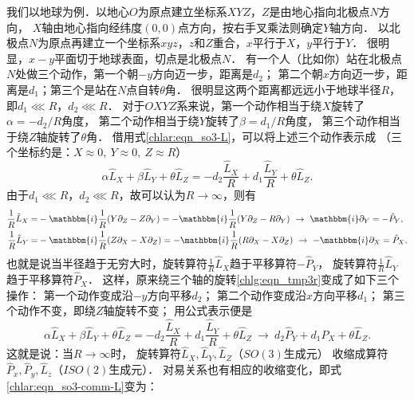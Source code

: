 我们以地球为例．以地心$O$为原点建立坐标系$XYZ$，$Z$是由地心指向北极点$N$方向，
$X$轴由地心指向经纬度$(0,0)$点方向，按右手叉乘法则确定$Y$轴方向．
以北极点$N$为原点再建立一个坐标系$xyz$，$z$和$Z$重合，$x$平行于$X$，$y$平行于$Y$．
很明显，$x-y$平面切于地球表面，切点是北极点$N$．
有一个人（比如你）站在北极点$N$处做三个动作，第一个朝$-y$方向迈一步，距离是$d_2$；
第二个朝$x$方向迈一步，距离是$d_1$；第三个是站在$N$点自转$\theta$角．
很明显这两个距离都远远小于地球半径$R$，即$d_1 \lll R$，$d_2\lll R$．
对于$OXYZ$系来说，第一个动作相当于绕$X$旋转了$\alpha=-d_2/R$角度，
第二个动作相当于绕$Y$旋转了$\beta=d_1/R$角度，
第三个动作相当于绕$Z$轴旋转了$\theta$角．
借用式\eqref{chlar:eqn_so3-L}，可以将上述三个动作表示成
（三个坐标约是：$X\approx 0,\ Y\approx 0,\  Z\approx R$）
\begin{equation}\label{chlg:eqn_tmp3r}
    \alpha \hat{L}_X + \beta \hat{L}_Y + \theta \hat{L}_Z
    =-d_2\frac{\hat{L}_X}{R}  + d_1\frac{\hat{L}_Y}{R}  + \theta \hat{L}_Z.
\end{equation}
由于$d_1 \lll R$，$d_2\lll R$，故可以认为$R\to \infty$，则有
    \begin{align*}
        \frac{1}{R}\hat{L}_X =& -\mathbbm{i} \frac{1}{R} (Y \partial_Z - Z \partial_Y )
        =-\mathbbm{i} \frac{1}{R} (Y \partial_Z - R \partial_Y )
        \ \to\ \mathbbm{i} \partial_Y = -\hat{P}_Y, \\
        \frac{1}{R}\hat{L}_Y =& -\mathbbm{i} \frac{1}{R} (Z \partial_X - X \partial_Z ) 
        =-\mathbbm{i} \frac{1}{R} (R \partial_X - X \partial_Z )
        \ \to\ -\mathbbm{i} \partial_X = \hat{P}_X .
    \end{align*}
也就是说当半径趋于无穷大时，旋转算符$\frac{1}{R}\hat{L}_X$趋于平移算符$-\hat{P}_Y$，
旋转算符$\frac{1}{R}\hat{L}_Y$趋于平移算符$\hat{P}_X$．
这样，原来绕三个轴的旋转\eqref{chlg:eqn_tmp3r}变成了如下三个操作：
第一个动作变成沿$-y$方向平移$d_2$；
第二个动作变成沿$x$方向平移$d_1$；
第三个动作不变，即绕$Z$轴旋转不变；
用公式表示便是
\begin{equation}\label{chlg:eqn_tmp-rpp}
    \alpha \hat{L}_X + \beta \hat{L}_Y + \theta \hat{L}_Z
    =-d_2\frac{\hat{L}_X}{R}  + d_1\frac{\hat{L}_Y}{R}  + \theta \hat{L}_Z
    \ \to \    d_2\hat{P}_Y  + d_1 \hat{P}_X  + \theta \hat{L}_Z .
\end{equation}
这就是说：当$R\to \infty$时，
旋转算符$\hat{L}_X,\hat{L}_Y,\hat{L}_Z$（$SO(3)$生成元）
收缩成算符$\hat{P}_x,\hat{P}_y,\hat{L}_z$（$ISO(2)$生成元）．
对易关系也有相应的收缩变化，即式\eqref{chlar:eqn_so3-comm-L}变为：
\setlength{\mathindent}{0em}
